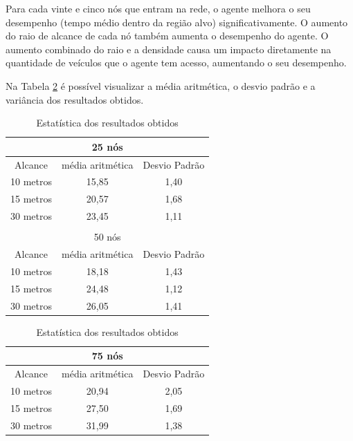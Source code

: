 	Para cada vinte e cinco nós que entram na rede, o agente melhora o seu desempenho (tempo médio dentro da região alvo) significativamente. O aumento do raio de alcance de cada nó também aumenta o desempenho do agente. O aumento combinado do raio e a densidade causa um impacto diretamente na quantidade de veículos que o agente tem acesso, aumentando o seu desempenho.

	Na Tabela \ref{tab:estatiscaResultadosObtidosComInfraestrutura} é possível visualizar a média aritmética, o desvio padrão e a variância dos resultados obtidos.

	\begin{table}[!htb]
	    \caption{Estatística dos resultados obtidos}
	    \label{tab:estatiscaResultadosObtidosComInfraestrutura}
	    \centering
	    \tiny
	    \begin{minipage}{.5\linewidth}
	      
	      \centering
	        \begin{tabular}{|c|c|c|}

			\hline
			\multicolumn{3}{|c|}{25 nós} \\ \hline
			Alcance   & média aritmética &	Desvio Padrão   \\ \hline
			10 metros &	15,85 & 1,40   \\ \hline
			15 metros &	20,57 & 1,68   \\ \hline
			30 metros &	23,45 & 1,11  \\ \hline

			\multicolumn{3}{|c|}{} \\ \hline

			\multicolumn{3}{|c|}{50 nós} \\ \hline
			Alcance   & média aritmética &	Desvio Padrão   \\ \hline
			10 metros &	18,18 & 1,43   \\ \hline
			15 metros &	24,48 & 1,12  \\ \hline
			30 metros &	26,05 & 1,41  \\ \hline

		\end{tabular}
	    \end{minipage}%
	    \begin{minipage}{.5\linewidth}
	      \centering
	        \begin{tabular}{|c|c|c|}
	        \hline
			\multicolumn{3}{|c|}{75 nós} \\ \hline
			Alcance   & média aritmética &	Desvio Padrão   \\ \hline
			10 metros &	20,94 & 2,05   \\ \hline
			15 metros &	27,50 & 1,69   \\ \hline
			30 metros &	31,99 & 1,38 \\ \hline


\end{tabular}
\end{minipage}
\end{table}

